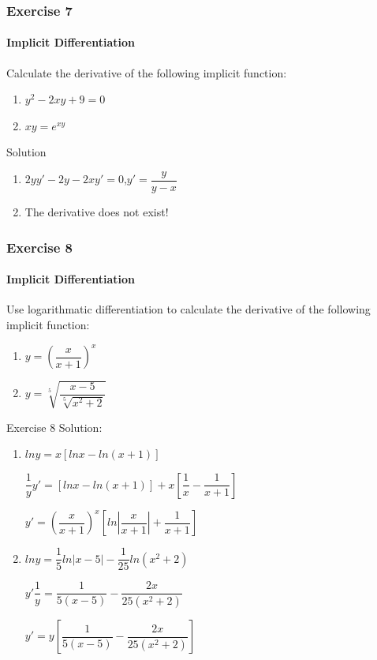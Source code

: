 \begin{frame}
    \frametitle{Exercise 7}
    \framesubtitle{Implicit Differentiation}
    Calculate the derivative of the following implicit function:
    \begin{enumerate}
        \item $y^{2} - 2xy + 9 = 0$
        \item $xy = e^{xy}$
    \end{enumerate}
\end{frame}


\begin{frame}{Solution}
    \begin{enumerate}
        \item $2yy'-2y-2xy'=0$,$y'=\dfrac{y}{y-x}$
        \item The derivative does not exist!
    \end{enumerate}
\end{frame}


\begin{frame}
    \frametitle{Exercise 8}
    \framesubtitle{Implicit Differentiation}
    Use \alert{logarithmatic differentiation} to calculate the derivative of the following implicit function:
    \begin{enumerate}
        \item $y = (\dfrac{x}{x + 1})^{x}$
        \item $y = \sqrt[5]{\dfrac{x - 5}{\sqrt[5]{x^{2} + 2}}}$
    \end{enumerate}
\end{frame}



\begin{frame}{Exercise 8}
    Solution:
    \begin{enumerate}
        \item $lny = x[lnx - ln(x+1)]$

              $\dfrac{1}{y}y' = [lnx - ln(x+1)] + x[\dfrac{1}{x} - \dfrac{1}{x+1}]$

              $y' = (\dfrac{x}{x+1})^x [ln|\dfrac{x}{x+1}| + \dfrac{1}{x+1}]$
        \item $lny = \dfrac{1}{5}ln|x-5| - \dfrac{1}{25}ln(x^2 + 2)$

              $y'\dfrac{1}{y} = \dfrac{1}{5(x-5)} - \dfrac{2x}{25(x^2+2)}$

              $y' = y[\dfrac{1}{5(x-5)} - \dfrac{2x}{25(x^2+2)}]$
    \end{enumerate}
\end{frame}




